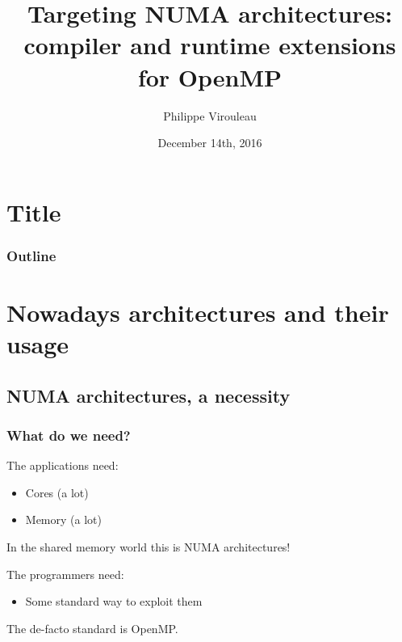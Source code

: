 \documentclass[xcolor={usenames,dvipsnames,svgnames,table}, aspectratio=43]{beamer}
\title[CORSE-STORM Workshop]{Targeting NUMA architectures: compiler and runtime extensions for OpenMP
}
\author[P. Virouleau]{
Philippe Virouleau}
\institute[CORSE/AVALON]{Inria - CORSE/AVALON teams}
\date{December 14th, 2016}
\begin{document}



\section*{Title}
\mymaketitle

\begin{frame}
  \frametitle{Outline}
  \tableofcontents%
\end{frame}

\section{Nowadays architectures and their usage}

\subsection{NUMA architectures, a necessity}

\begin{frame}
\frametitle{What do we need?}
\begin{block}{The applications need:}
    \begin{itemize}
      \item Cores (a lot)
      \item Memory (a lot)
    \end{itemize}
    In the shared memory world this is NUMA architectures!
\end{block}

\begin{block}{The programmers need:}
    \begin{itemize}
      \item Some standard way to exploit them
    \end{itemize}
    The de-facto standard is OpenMP.
\end{block}
\end{frame}
\end{document}
